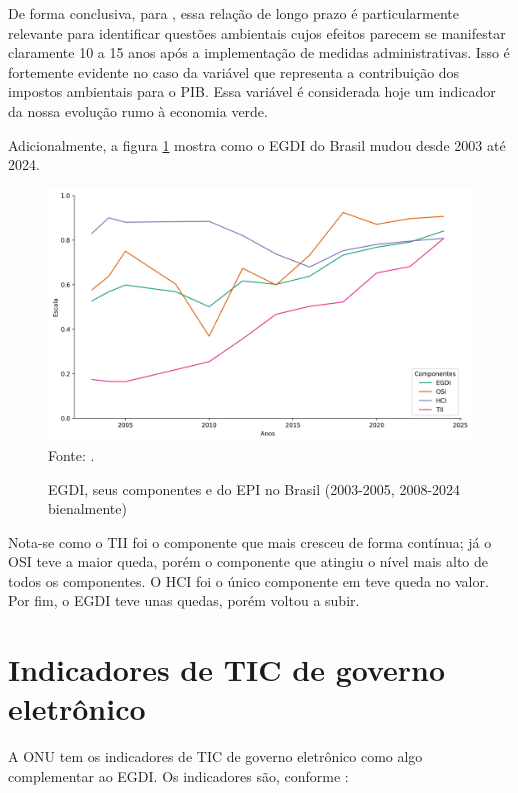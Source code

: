 De forma conclusiva, para \cite{ziolo2022government}, essa relação de longo prazo é particularmente relevante para identificar questões ambientais cujos efeitos parecem se manifestar claramente 10 a 15 anos após a implementação de medidas administrativas. Isso é fortemente evidente no caso da variável que representa a contribuição dos impostos ambientais para o PIB. Essa variável é considerada hoje um indicador da nossa evolução rumo à economia verde.

Adicionalmente, a figura \ref{fig:egdi_brasil_2003_2024} mostra como o EGDI do Brasil mudou desde 2003 até 2024. 

\begin{figure}[H]
	\centering
	\caption{EGDI, seus componentes e do EPI no Brasil (2003-2005, 2008-2024 bienalmente)}
	\includegraphics[width=1\linewidth]{figuras/egdi_brasil_2003_2024.PNG}
	\label{fig:egdi_brasil_2003_2024}
	\footnotesize{Fonte: \cite{ONU_EGDI_dados}.}
\end{figure}

Nota-se como o TII foi o componente que mais cresceu de forma contínua; já o OSI teve a maior queda, porém o componente que atingiu o nível mais alto de todos os componentes. O HCI foi o único componente em teve queda no valor. Por fim, o EGDI teve unas quedas, porém voltou a subir.

\section{Indicadores de TIC de governo eletrônico}
\label{indicadores_tic_egov}

A ONU tem os indicadores de TIC de governo eletrônico como algo complementar ao EGDI. Os indicadores são, conforme \cite{ONU_ICT_in_government_indicators}:

